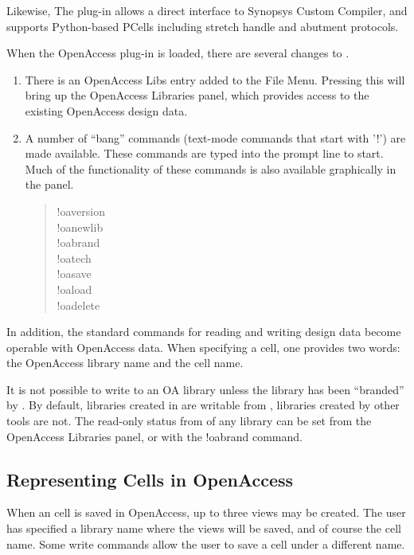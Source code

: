 \begin{itemize}
Likewise, The plug-in allows a direct interface to Synopsys Custom
Compiler, and supports Python-based PCells including stretch handle
and abutment protocols.

When the OpenAccess plug-in is loaded, there are several changes to
{\Xic}.

\begin{enumerate}
\item{There is an {\cb OpenAccess Libs} entry added to the {\cb File
Menu}.  Pressing this will bring up the {\cb OpenAccess Libraries}
panel, which provides access to the existing OpenAccess design data.}

\item{A number of ``bang'' commands (text-mode commands that start
with '!') are made available.  These commands are typed into the
prompt line to start.  Much of the functionality of these commands is
also available graphically in the panel.
\begin{quote}
{\cb !oaversion}\\
{\cb !oanewlib}\\
{\cb !oabrand}\\
{\cb !oatech}\\
{\cb !oasave}\\
{\cb !oaload}\\
{\cb !oadelete}
\end{quote}
}
\end{enumerate}

In addition, the standard commands for reading and writing design data
become operable with OpenAccess data.  When specifying a cell, one
provides two words:  the OpenAccess library name and the cell name.

It is not possible to write to an OA library unless the library has
been ``branded'' by {\Xic}.  By default, libraries created in {\Xic}
are writable from {\Xic}, libraries created by other tools are not. 
The read-only status from {\Xic} of any library can be set from the
{\cb OpenAccess Libraries} panel, or with the {\cb !oabrand} command.

\subsection{Representing {\Xic} Cells in OpenAccess}

When an {\Xic} cell is saved in OpenAccess, up to three views may be
created.  The user has specified a library name where the views will
be saved, and of course the cell name.  Some write commands allow the
user to save a cell under a different name.


\end{itemize}
